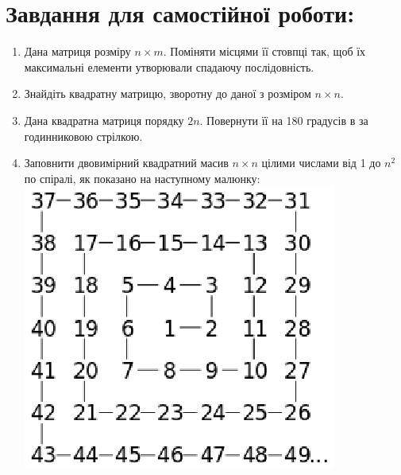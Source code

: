 \documentclass[a5paper,titlepage,openany,twoside,draft]{book_unv}%
\begin{document}
\section{Завдання для самостійної роботи:}

\begin{enumerate}
\def\labelenumi{\arabic{enumi})}
\setcounter{enumi}{6}
\item
  Дана матриця розміру $n \times m$. Поміняти місцями її стовпці так, щоб їх
  максимальні елементи утворювали спадаючу послідовність.
\item
  Знайдіть квадратну матрицю, зворотну до даної з розміром $n \times n$.
\item
  Дана квадратна матриця порядку $2n$. Повернути її на 180 градусів в
  за годинниковою стрілкою.

\item
  Заповнити двовимірний квадратний масив $n\times n$ цілими числами від 1 до $n^2$ по
  спіралі, як показано на наступному малюнку:\\
  \includegraphics{spiral5.eps}
   

\end{enumerate}
\end{document}
